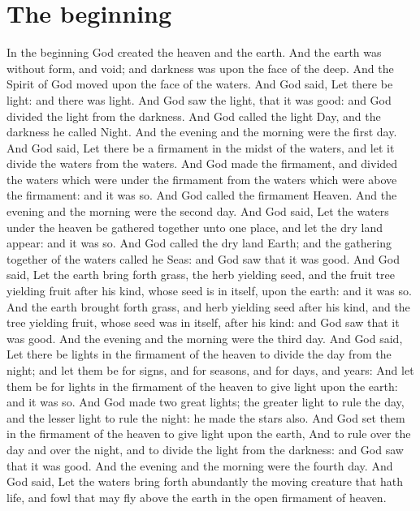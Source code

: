 
\section*{The beginning}
\begin{biblechapter} %
\verse In the beginning God created the heaven and the earth.
\verse And the earth was without form, and void; and darkness was upon the face of the deep. And the Spirit of God moved upon the face of the waters.
\verse And God said, Let there be light: and there was light.
\verse And God saw the light, that it was good: and God divided the light from the darkness.
\verse And God called the light Day, and the darkness he called Night. And the evening and the morning were the first day.
\verse And God said, Let there be a firmament in the midst of the waters, and let it divide the waters from the waters.
\verse And God made the firmament, and divided the waters which were under the firmament from the waters which were above the firmament: and it was so.
\verse And God called the firmament Heaven. And the evening and the morning were the second day.
\verse And God said, Let the waters under the heaven be gathered together unto one place, and let the dry land appear: and it was so.
\verse And God called the dry land Earth; and the gathering together of the waters called he Seas: and God saw that it was good.
\verse And God said, Let the earth bring forth grass, the herb yielding seed, and the fruit tree yielding fruit after his kind, whose seed is in itself, upon the earth: and it was so.
\verse And the earth brought forth grass, and herb yielding seed after his kind, and the tree yielding fruit, whose seed was in itself, after his kind: and God saw that it was good.
\verse And the evening and the morning were the third day.
\verse And God said, Let there be lights in the firmament of the heaven to divide the day from the night; and let them be for signs, and for seasons, and for days, and years:
\verse And let them be for lights in the firmament of the heaven to give light upon the earth: and it was so.
\verse And God made two great lights; the greater light to rule the day, and the lesser light to rule the night: he made the stars also.
\verse And God set them in the firmament of the heaven to give light upon the earth,
\verse And to rule over the day and over the night, and to divide the light from the darkness: and God saw that it was good.
\verse And the evening and the morning were the fourth day.
\verse And God said, Let the waters bring forth abundantly the moving creature that hath life, and fowl that may fly above the earth in the open firmament of heaven.

\end{biblechapter}
